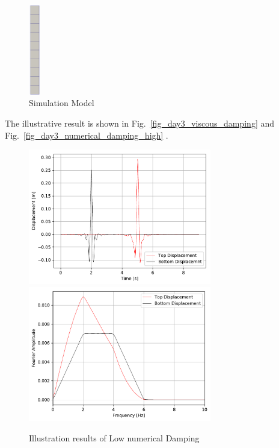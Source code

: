 \begin{figure}[H]
  \centering
  \includegraphics[width = 0.5cm]{./Figure-files/Day3/Numerical_Damping_Example/overview.png}
  \caption{Simulation Model}
  \label{fig_contact_examples2}
\end{figure}


The illustrative result is shown in Fig.~\ref{fig_day3_viscous_damping} and Fig.~\ref{fig_day3_numerical_damping_high} .

\begin{figure}[H]
  \centering
  \includegraphics[width = 8cm]{./Figure-files/Day3/Numerical_Damping_Example/newmark06Displacement.pdf}
  \includegraphics[width = 8cm]{./Figure-files/Day3/Numerical_Damping_Example/newmark06Displacement_Spectrum.pdf}
  \caption{Illustration results of Low numerical Damping}
  \label{fig_day3_numerical_damping}
\end{figure}

